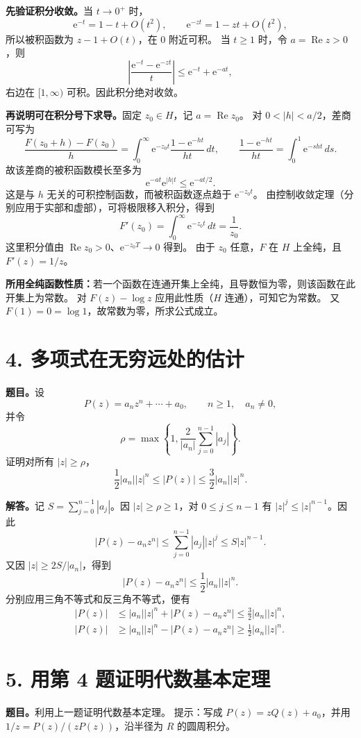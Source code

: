 \documentclass[11pt,a4paper]{ctexart}
\newcommand{\e}{\mathrm e}
\begin{document}
\textbf{先验证积分收敛。}当 $t\to0^+$ 时，
\[
\e^{-t}=1-t+O(t^2),\qquad
\e^{-zt}=1-zt+O(t^2),
\]
所以被积函数为 $z-1+O(t)$，在 $0$ 附近可积。
当 $t\ge1$ 时，令 $a=\operatorname{Re}z>0$，则
\[
\left|\frac{\e^{-t}-\e^{-zt}}t\right|
\le\e^{-t}+\e^{-at},
\]
右边在 $[1,\infty)$ 可积。因此积分绝对收敛。

\textbf{再说明可在积分号下求导。}固定 $z_0\in H$，记 $a=\operatorname{Re}z_0$。
对 $0<|h|<a/2$，差商可写为
\[
\frac{F(z_0+h)-F(z_0)}h
=\int_0^\infty\e^{-z_0t}\frac{1-\e^{-ht}}{ht}\,dt,
\qquad
\frac{1-\e^{-ht}}{ht}=\int_0^1\e^{-sht}\,ds.
\]
故该差商的被积函数模长至多为
\[
\e^{-at}\e^{|h|t}\le\e^{-at/2}.
\]
这是与 $h$ 无关的可积控制函数，而被积函数逐点趋于 $\e^{-z_0t}$。
由控制收敛定理（分别应用于实部和虚部），可将极限移入积分，得到
\[
F'(z_0)=\int_0^\infty\e^{-z_0t}\,dt=\frac1{z_0}.
\]
这里积分值由 $\operatorname{Re}z_0>0$、$\e^{-z_0T}\to0$ 得到。
由于 $z_0$ 任意，$F$ 在 $H$ 上全纯，且 $F'(z)=1/z$。

\textbf{所用全纯函数性质：}若一个函数在连通开集上全纯，且导数恒为零，则该函数在此开集上为常数。
对 $F(z)-\log z$ 应用此性质（$H$ 连通），可知它为常数。
又 $F(1)=0=\log1$，故常数为零，所求公式成立。

\newpage
\section*{4. 多项式在无穷远处的估计}
\textbf{题目。}设
\[
P(z)=a_nz^n+\cdots+a_0,\qquad n\ge1,\quad a_n\ne0,
\]
并令
\[
\rho=\max\left\{1,\frac2{|a_n|}\sum_{j=0}^{n-1}|a_j|\right\}.
\]
证明对所有 $|z|\ge\rho$，
\[
\frac12|a_n||z|^n\le |P(z)|\le\frac32|a_n||z|^n.
\]

\textbf{解答。}记 $S=\sum_{j=0}^{n-1}|a_j|$。因 $|z|\ge\rho\ge1$，对 $0\le j\le n-1$ 有 $|z|^j\le|z|^{n-1}$。因此
\[
|P(z)-a_nz^n|
\le\sum_{j=0}^{n-1}|a_j||z|^j
\le S|z|^{n-1}.
\]
又因 $|z|\ge2S/|a_n|$，得到
\[
|P(z)-a_nz^n|\le\frac12|a_n||z|^n.
\]
分别应用三角不等式和反三角不等式，便有
\begin{align*}
|P(z)|&\le |a_n||z|^n+|P(z)-a_nz^n|
\le\frac32|a_n||z|^n,\\
|P(z)|&\ge |a_n||z|^n-|P(z)-a_nz^n|
\ge\frac12|a_n||z|^n.
\end{align*}

\section*{5. 用第 4 题证明代数基本定理}
\textbf{题目。}利用上一题证明代数基本定理。
提示：写成 $P(z)=zQ(z)+a_0$，并用 $1/z=P(z)/(zP(z))$，沿半径为 $R$ 的圆周积分。
\end{document}
